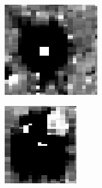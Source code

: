 \documentclass[a4paper, 12pt, titlepage, oneside, french]{article}
\begin{document}
	\begin{figure}[H]
		\centering
		\begin{subfigure}[b]{0.3\linewidth}
			\includegraphics[width=\linewidth]{DipoleExemple1.png}
		\end{subfigure}
		\begin{subfigure}[b]{0.3\linewidth}
			\includegraphics[width=\linewidth]{DipoleExemple2.png}

\end{subfigure}
\end{figure}
\end{document}
